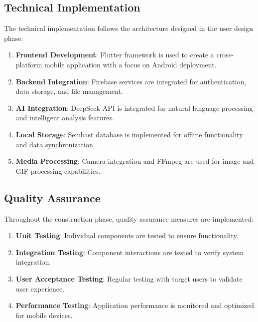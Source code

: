 \subsection{Technical Implementation}\label{subsec:technicalImplementation}

The technical implementation follows the architecture designed in the user design phase:

\begin{enumerate}
    \item \textbf{Frontend Development}: Flutter framework is used to create a cross-platform mobile application with a focus on Android deployment.
    
    \item \textbf{Backend Integration}: Firebase services are integrated for authentication, data storage, and file management.
    
    \item \textbf{AI Integration}: DeepSeek API is integrated for natural language processing and intelligent analysis features.
    
    \item \textbf{Local Storage}: Sembast database is implemented for offline functionality and data synchronization.
    
    \item \textbf{Media Processing}: Camera integration and FFmpeg are used for image and GIF processing capabilities.
\end{enumerate}

\subsection{Quality Assurance}\label{subsec:qualityAssurance}

Throughout the construction phase, quality assurance measures are implemented:

\begin{enumerate}
    \item \textbf{Unit Testing}: Individual components are tested to ensure functionality.
    
    \item \textbf{Integration Testing}: Component interactions are tested to verify system integration.
    
    \item \textbf{User Acceptance Testing}: Regular testing with target users to validate user experience.
    
    \item \textbf{Performance Testing}: Application performance is monitored and optimized for mobile devices.
\end{enumerate}

